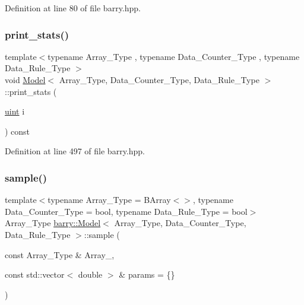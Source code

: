 Definition at line 80 of file barry.\+hpp.

\mbox{\label{classbarry_1_1_model_ac00b5c6a1446ad00fdf1d92c9cb1df3c}} 
\subsubsection{\texorpdfstring{print\+\_\+stats()}{print\_stats()}}
{\footnotesize\ttfamily template$<$typename Array\+\_\+\+Type , typename Data\+\_\+\+Counter\+\_\+\+Type , typename Data\+\_\+\+Rule\+\_\+\+Type $>$ \\
void \hyperlink{classbarry_1_1_model}{Model}$<$ Array\+\_\+\+Type, Data\+\_\+\+Counter\+\_\+\+Type, Data\+\_\+\+Rule\+\_\+\+Type $>$\+::print\+\_\+stats (\begin{DoxyParamCaption}\item[{\hyperlink{namespacebarry_a11dfc53ddb4672278319aa04f1e09a6c}{uint}}]{i }\end{DoxyParamCaption}) const\hspace{0.3cm}{\ttfamily [inline]}}



Definition at line 497 of file barry.\+hpp.

\mbox{\label{classbarry_1_1_model_a1b7b9ad1362b8de49c00e7e8d5d3675e}} 
\subsubsection{\texorpdfstring{sample()}{sample()}\hspace{0.1cm}{\footnotesize\ttfamily [1/2]}}
{\footnotesize\ttfamily template$<$typename Array\+\_\+\+Type  = B\+Array$<$$>$, typename Data\+\_\+\+Counter\+\_\+\+Type  = bool, typename Data\+\_\+\+Rule\+\_\+\+Type  = bool$>$ \\
Array\+\_\+\+Type \hyperlink{classbarry_1_1_model}{barry\+::\+Model}$<$ Array\+\_\+\+Type, Data\+\_\+\+Counter\+\_\+\+Type, Data\+\_\+\+Rule\+\_\+\+Type $>$\+::sample (\begin{DoxyParamCaption}\item[{const Array\+\_\+\+Type \&}]{Array\+\_\+,  }\item[{const std\+::vector$<$ double $>$ \&}]{params = {\ttfamily \{\}} }\end{DoxyParamCaption})}

